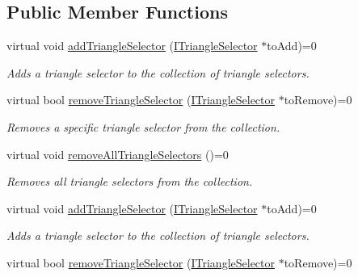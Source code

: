\subsection*{Public Member Functions}
\begin{DoxyCompactItemize}
\item 
virtual void \hyperlink{classirr_1_1scene_1_1IMetaTriangleSelector_afb19b5f7cbf37d202b09c126417f9a83}{add\+Triangle\+Selector} (\hyperlink{classirr_1_1scene_1_1ITriangleSelector}{I\+Triangle\+Selector} $\ast$to\+Add)=0
\begin{DoxyCompactList}\small\item\em Adds a triangle selector to the collection of triangle selectors. \end{DoxyCompactList}\item 
virtual bool \hyperlink{classirr_1_1scene_1_1IMetaTriangleSelector_ac1534f0bb8bb24a196ae262f3a80f32d}{remove\+Triangle\+Selector} (\hyperlink{classirr_1_1scene_1_1ITriangleSelector}{I\+Triangle\+Selector} $\ast$to\+Remove)=0
\begin{DoxyCompactList}\small\item\em Removes a specific triangle selector from the collection. \end{DoxyCompactList}\item 
\mbox{\label{classirr_1_1scene_1_1IMetaTriangleSelector_a4137793b61aed8cc8e60f8362feba939}} 
virtual void \hyperlink{classirr_1_1scene_1_1IMetaTriangleSelector_a4137793b61aed8cc8e60f8362feba939}{remove\+All\+Triangle\+Selectors} ()=0
\begin{DoxyCompactList}\small\item\em Removes all triangle selectors from the collection. \end{DoxyCompactList}\item 
virtual void \hyperlink{classirr_1_1scene_1_1IMetaTriangleSelector_afb19b5f7cbf37d202b09c126417f9a83}{add\+Triangle\+Selector} (\hyperlink{classirr_1_1scene_1_1ITriangleSelector}{I\+Triangle\+Selector} $\ast$to\+Add)=0
\begin{DoxyCompactList}\small\item\em Adds a triangle selector to the collection of triangle selectors. \end{DoxyCompactList}\item 
virtual bool \hyperlink{classirr_1_1scene_1_1IMetaTriangleSelector_ac1534f0bb8bb24a196ae262f3a80f32d}{remove\+Triangle\+Selector} (\hyperlink{classirr_1_1scene_1_1ITriangleSelector}{I\+Triangle\+Selector} $\ast$to\+Remove)=0

\end{DoxyCompactItemize}
